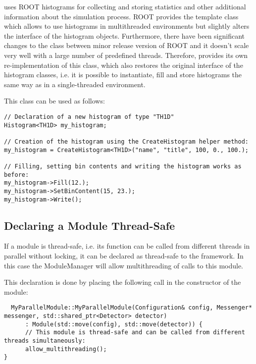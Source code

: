 \apsq uses ROOT histograms for collecting and storing statistics and other additional information about the simulation process.
ROOT provides the template class  which allows to use histograms in multithreaded environments but slightly alters the interface of the histogram objects.
Furthermore, there have been significant changes to the class between minor release version of ROOT and it doesn't scale very well with a large number of predefined threads.
Therefore, \apsq provides its own re-implementation of this class,  which also restores the original interface of the histogram classes, i.e. it is possible to instantiate, fill and store histograms the same way as in a single-threaded environment.

This class can be used as follows:
\begin{verbatim}
// Declaration of a new histogram of type "TH1D"
Histogram<TH1D> my_histogram;

// Creation of the histogram using the CreateHistogram helper method:
my_histogram = CreateHistogram<TH1D>("name", "title", 100, 0., 100.);

// Filling, setting bin contents and writing the histogram works as before:
my_histogram->Fill(12.);
my_histogram->SetBinContent(15, 23.);
my_histogram->Write();
\end{verbatim}

\subsection{Declaring a Module Thread-Safe}

If a module is thread-safe, i.e. its  function can be called from different threads in parallel without locking, it can be declared as thread-safe to the framework.
In this case the ModuleManager will allow multithreading of calls to this module.

This declaration is done by placing the following call in the constructor of the module:
\begin{verbatim}
  MyParallelModule::MyParallelModule(Configuration& config, Messenger* messenger, std::shared_ptr<Detector> detector)
      : Module(std::move(config), std::move(detector)) {
      // This module is thread-safe and can be called from different threads simultaneously:
      allow_multithreading();
}
\end{verbatim}

